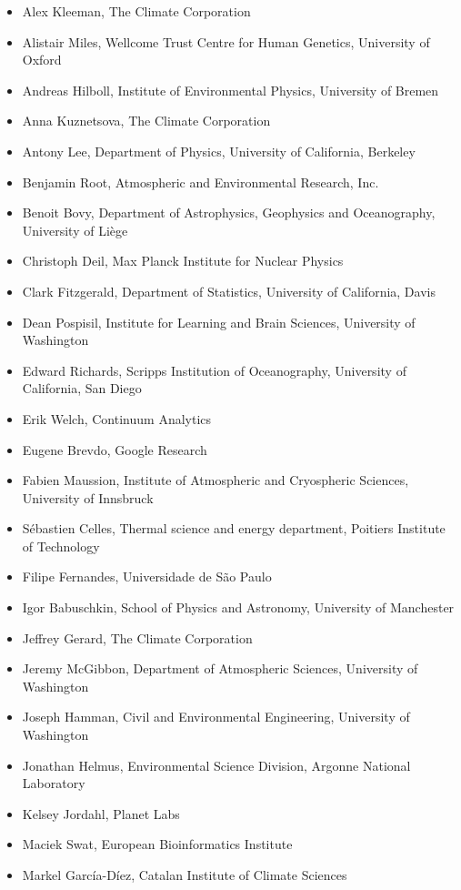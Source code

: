 \documentclass{jors}
\begin{document}
\begin{itemize}
\item Alex Kleeman, The Climate Corporation
\item Alistair Miles, Wellcome Trust Centre for Human Genetics, University of Oxford
\item Andreas Hilboll, Institute of Environmental Physics, University of Bremen
\item Anna Kuznetsova, The Climate Corporation
\item Antony Lee, Department of Physics, University of California, Berkeley
\item Benjamin Root, Atmospheric and Environmental Research, Inc.
\item Benoit Bovy, Department of Astrophysics, Geophysics and Oceanography, University of Liège
\item Christoph Deil, Max Planck Institute for Nuclear Physics
\item Clark Fitzgerald, Department of Statistics, University of California, Davis
\item Dean Pospisil, Institute for Learning and Brain Sciences, University of Washington
\item Edward Richards, Scripps Institution of Oceanography, University of California, San Diego
\item Erik Welch, Continuum Analytics
\item Eugene Brevdo, Google Research
\item Fabien Maussion, Institute of Atmospheric and Cryospheric Sciences, University of Innsbruck
\item Sébastien Celles, Thermal science and energy department, Poitiers Institute of Technology
\item Filipe Fernandes, Universidade de São Paulo
\item Igor Babuschkin, School of Physics and Astronomy, University of Manchester
\item Jeffrey Gerard, The Climate Corporation
\item Jeremy McGibbon, Department of Atmospheric Sciences, University of Washington
\item Joseph Hamman, Civil and Environmental Engineering, University of Washington
\item Jonathan Helmus, Environmental Science Division, Argonne National Laboratory
\item Kelsey Jordahl, Planet Labs
\item Maciek Swat, European Bioinformatics Institute
\item Markel García-Díez, Catalan Institute of Climate Sciences

\end{itemize}
\end{document}
